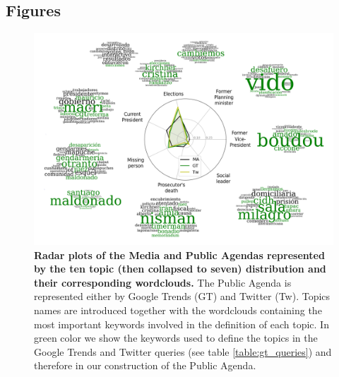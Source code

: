 \documentclass{bmcart}
\begin{document}
\begin{backmatter}

\section*{Figures}

\begin{figure}[h!]
\includegraphics[width = \textwidth]{Fig1.pdf}
\caption{\textbf{Radar plots of the Media and Public Agendas represented by the ten topic (then collapsed to seven) distribution and their corresponding wordclouds.} The Public Agenda is represented either by Google Trends (GT) and Twitter (Tw). Topics names are introduced together with the wordclouds containing the most important keywords involved in the definition of each topic. In green color we show the keywords used to define the topics in the Google Trends and Twitter queries (see table \ref{table:gt_queries}) and therefore in our construction of the Public Agenda.}
\label{fig:topics_wordclouds}
\end{figure}


\end{backmatter}
\end{document}
